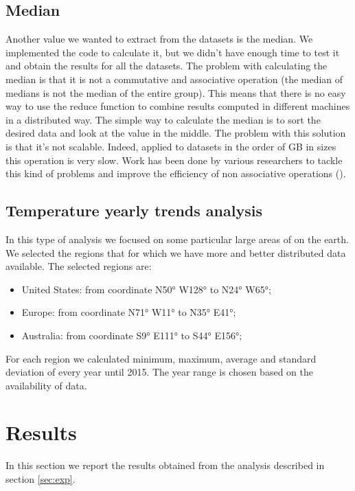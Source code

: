 \documentclass{vldb}
\begin{document}
\subsection{Median}
Another value we wanted to extract from the datasets is the median. We implemented the code to calculate it, but we didn't have enough time to test it and obtain the results for all the datasets. The problem with calculating the median is that it is not a commutative and associative operation (the median of medians is not the median of the entire group). This means that there is no easy way to use the reduce function to combine results computed in different machines in a distributed way. The simple way to calculate the median is to sort the desired data and look at the value in the middle. The problem with this solution is that it's not scalable. Indeed, applied to datasets in the order of GB in sizes this operation is very slow. Work has been done by various researchers to tackle this kind of problems and improve the efficiency of non associative operations (\cite{liu2009computing}).



\subsection{Temperature yearly trends analysis}
In this type of analysis we focused on some particular large areas of on the earth. We selected the regions that for which we have more and better distributed data available. The selected regions are:
\begin{itemize}
    \item United States: from coordinate N\ang{50;;} W\ang{128;;} to N\ang{24;;} W\ang{65;;};
    \item Europe: from coordinate N\ang{71;;} W\ang{11;;} to N\ang{35;;} E\ang{41;;};
    \item Australia: from coordinate S\ang{9;;} E\ang{111;;} to S\ang{44;;} E\ang{156;;};
\end{itemize}
For each region we calculated minimum, maximum, average and standard deviation of every year until 2015. The year range is chosen based on the availability of data. 

\section{Results}
\label{sec:res}
In this section we report the results obtained from the analysis described in section \ref{sec:exp}. 
\end{document}
